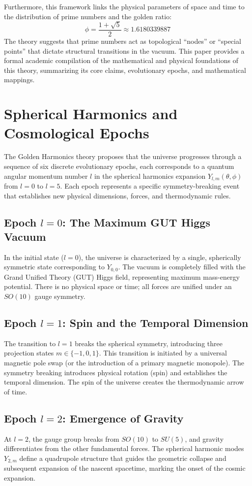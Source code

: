 \documentclass[11pt,twoside,a4paper]{article}
\begin{document}
Furthermore, this framework links the physical parameters of space and time to the distribution of prime numbers and the golden ratio:
\begin{equation}
\phi = \frac{1 + \sqrt{5}}{2} \approx 1.6180339887
\end{equation}
The theory suggests that prime numbers act as topological ``nodes'' or ``special points'' that dictate structural transitions in the vacuum. This paper provides a formal academic compilation of the mathematical and physical foundations of this theory, summarizing its core claims, evolutionary epochs, and mathematical mappings.

\section{Spherical Harmonics and Cosmological Epochs}
The Golden Harmonics theory proposes that the universe progresses through a sequence of six discrete evolutionary epochs, each corresponds to a quantum angular momentum number $l$ in the spherical harmonics expansion $Y_{l,m}(\theta, \phi)$ from $l = 0$ to $l = 5$. Each epoch represents a specific symmetry-breaking event that establishes new physical dimensions, forces, and thermodynamic rules.

\subsection{Epoch $l = 0$: The Maximum GUT Higgs Vacuum}
In the initial state ($l=0$), the universe is characterized by a single, spherically symmetric state corresponding to $Y_{0,0}$. The vacuum is completely filled with the Grand Unified Theory (GUT) Higgs field, representing maximum mass-energy potential. There is no physical space or time; all forces are unified under an $SO(10)$ gauge symmetry.

\subsection{Epoch $l = 1$: Spin and the Temporal Dimension}
The transition to $l=1$ breaks the spherical symmetry, introducing three projection states $m \in \{-1, 0, 1\}$. This transition is initiated by a universal magnetic pole swap (or the introduction of a primary magnetic monopole). The symmetry breaking introduces physical rotation (spin) and establishes the temporal dimension. The spin of the universe creates the thermodynamic arrow of time.

\subsection{Epoch $l = 2$: Emergence of Gravity}
At $l=2$, the gauge group breaks from $SO(10)$ to $SU(5)$, and gravity differentiates from the other fundamental forces. The spherical harmonic modes $Y_{2,m}$ define a quadrupole structure that guides the geometric collapse and subsequent expansion of the nascent spacetime, marking the onset of the cosmic expansion.
\end{document}
